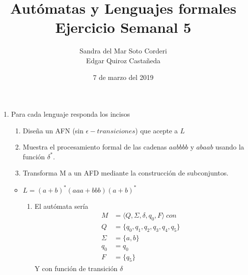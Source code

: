 \documentclass{article}
\begin{document}
    \title{
        Autómatas y Lenguajes formales \\
        Ejercicio Semanal 5
    }

    \author{
        Sandra del Mar Soto Corderi \\
        Edgar Quiroz Castañeda
    }

    \date{
        7 de marzo del 2019
    }
    
    \maketitle

    \begin{enumerate}
        \item {
            Para cada lenguaje responda los incisos
            \begin{enumerate}
                \item Diseña un AFN (sin $\epsilon-transiciones$) que acepte a 
                $L$
                \item Muestra el procesamiento formal de las cadenas $aabbbb$ y 
                $abaab$ usando la función $\delta^{*}$.
                \item Transforma M a un AFD mediante la construcción de 
                subconjuntos.
            \end{enumerate}
            \begin{itemize}
                \item $L = (a + b)^{*}(aaa + bbb)(a + b)^{*}$
                \begin{enumerate}
                    \item {
                        El autómata sería
                        \begin{align*}
                            M &= \langle Q, \Sigma, \delta, q_{0}, F \rangle \ con\\
                            Q &= \{q_{0}, q_{1}, q_{2}, q_{3}, q_{4}, q_{5}\} \\
                            \Sigma &= \{a, b\} \\
                            q_{0} &= q_{0} \\
                            F &= \{q_{5}\}
                        \end{align*}
                        Y con función de transición $\delta$
                        
}
\end{enumerate}
\end{itemize}}
\end{enumerate}
\end{document}
